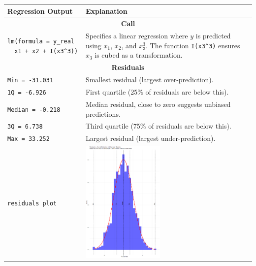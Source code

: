 \documentclass[]{article}
\begin{document}
\begin{longtable}{|p{}|p{}|}
	\hline
	\textbf{Regression Output} & \textbf{Explanation} \\
	\hline

	\hline
	\multicolumn{2}{|c|}{\textbf{Call}} \\
	\hline
	\texttt{lm(formula = y\_real ~ x1 + x2 + I(x3\textasciicircum3))} & 
	Specifies a linear regression where $y$ is predicted using $x_1$, $x_2$, and $x_3^3$. The function \texttt{I(x3\textasciicircum3)} ensures $x_3$ is cubed as a transformation. \\
	\hline

	\hline
	\multicolumn{2}{|c|}{\textbf{Residuals}} \\
	\hline
	\texttt{Min = -31.031} & Smallest residual (largest over-prediction). \\
	\hline
	\texttt{1Q = -6.926} & First quartile (25\% of residuals are below this). \\
	\hline
	\texttt{Median = -0.218 }& Median residual, close to zero suggests unbiased predictions. \\
	\hline
	\texttt{3Q = 6.738} & Third quartile (75\% of residuals are below this). \\
	\hline
	\texttt{Max = 33.252} & Largest residual (largest under-prediction). \\
	\hline
	\texttt{residuals plot} & \parbox[c]{5cm}{\centering\includegraphics[width=4cm]{img/img_2-3-1}} \\
	\hline


\end{longtable}
\end{document}
